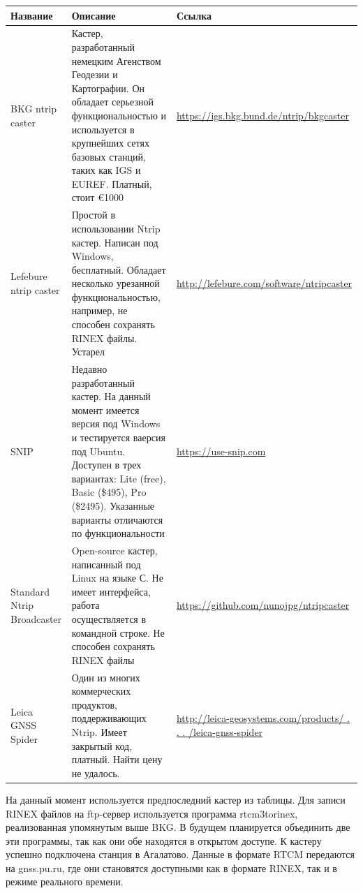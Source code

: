 \documentclass[a4paper,12pt]{report}
\begin{document}
\begin{center}
{\footnotesize
\begin{tabular}{| p{4cm} | p{8cm} | p{4cm} |}
\hline
\bf{Название} & \bf{Описание} & \bf{Ссылка} \\ \hline
BKG ntrip caster & Кастер, разработанный немецким Агенством Геодезии и Картографии. Он обладает серьезной функциональностью и используется в 
крупнейших сетях базовых станций, таких как IGS и EUREF. Платный, стоит \euro1000 & \url{https://igs.bkg.bund.de/ntrip/bkgcaster} \\ \hline
Lefebure ntrip caster & Простой в использовании Ntrip кастер. Написан под Windows, бесплатный. Обладает несколько урезанной функциональностью, 
например, не способен сохранять RINEX файлы. Устарел & \url{http://lefebure.com/software/ntripcaster} \\ \hline
SNIP & Недавно разработанный кастер. На данный момент имеется версия под Windows и тестируется ваерсия под Ubuntu. Доступен в трех вариантах: 
Lite (free), Basic (\$495), Pro (\$2495). Указанные варианты отличаются по функциональности & \url{https://use-snip.com} \\ \hline
Standard Ntrip Broadcaster & Open-source кастер, написанный под Linux на языке С. Не имеет интерфейса, работа осуществляется в командной строке. 
Не способен сохранять RINEX файлы & \url{https://github.com/nunojpg/ntripcaster} \\ \hline
Leica GNSS Spider & Один из многих коммерческих продуктов, поддерживающих Ntrip. Имеет закрытый код, платный. Найти цену не удалось.
& \url{http://leica-geosystems.com/products/ . . . /leica-gnss-spider} \\
\hline
\end{tabular}
}
\end{center}

На данный момент используется предпоследний кастер из таблицы. Для записи RINEX файлов на ftp-сервер 
используется программа rtcm3torinex, реализованная упомянутым выше BKG. В будущем планируется объединить две эти программы, так как они
обе находятся в открытом доступе. К кастеру успешно подключена станция в Агалатово. Данные в формате RTCM передаются на gnss.pu.ru, 
где они становятся доступными как в формате RINEX, так и в режиме реального времени.

\newpage
\end{document}
